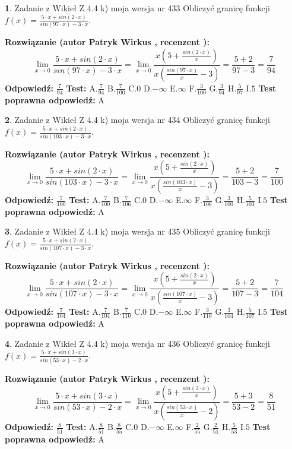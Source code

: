 \documentclass[12pt, a4paper]{article}
\theoremstyle{definition} %
\newtheorem{zad}{}
\newcommand{\zadStart}[1]{\begin{zad}#1\newline}
\newcommand{\zadStop}{\end{zad}}
\newcommand{\rozwStart}[2]{\noindent \textbf{Rozwiązanie (autor #1 , recenzent #2): }\newline}
\newcommand{\rozwStop}{\newline}
\newcommand{\odpStart}{\noindent \textbf{Odpowiedź:}\newline}
\newcommand{\odpStop}{\newline}
\newcommand{\testStart}{\noindent \textbf{Test:}\newline}
\newcommand{\testStop}{\newline}
\newcommand{\kluczStart}{\noindent \textbf{Test poprawna odpowiedź:}\newline}
\newcommand{\kluczStop}{\newline}
\begin{document}
\zadStart{Zadanie z Wikieł Z 4.4 k) moja wersja nr 433}
Obliczyć granicę funkcji $f(x)=\frac{5\cdot x +sin(2\cdot x)}{sin(97\cdot x) -3\cdot x}$.
\zadStop
\rozwStart{Patryk Wirkus}{}
$$\lim\limits_{x\to 0}\frac{5\cdot x +sin(2\cdot x)}{sin(97\cdot x) -3\cdot x}
=\lim\limits_{x\to 0}\frac{x(5+\frac{sin(2\cdot x)}{x})}{x(\frac{sin(97\cdot x)}{x}-3)}
=\frac{5+2}{97-3} = \frac{7}{94}$$
\rozwStop
\odpStart
$\frac{7}{94}$
\odpStop
\testStart
A.$\frac{7}{94}$
B.$\frac{7}{100}$
C.$0$
D.$-\infty$
E.$\infty$
F.$\frac{3}{100}$
G.$\frac{3}{94}$
H.$\frac{5}{97}$
I.$5$
\testStop
\kluczStart
A
\kluczStop



\zadStart{Zadanie z Wikieł Z 4.4 k) moja wersja nr 434}
Obliczyć granicę funkcji $f(x)=\frac{5\cdot x +sin(2\cdot x)}{sin(103\cdot x) -3\cdot x}$.
\zadStop
\rozwStart{Patryk Wirkus}{}
$$\lim\limits_{x\to 0}\frac{5\cdot x +sin(2\cdot x)}{sin(103\cdot x) -3\cdot x}
=\lim\limits_{x\to 0}\frac{x(5+\frac{sin(2\cdot x)}{x})}{x(\frac{sin(103\cdot x)}{x}-3)}
=\frac{5+2}{103-3} = \frac{7}{100}$$
\rozwStop
\odpStart
$\frac{7}{100}$
\odpStop
\testStart
A.$\frac{7}{100}$
B.$\frac{7}{106}$
C.$0$
D.$-\infty$
E.$\infty$
F.$\frac{3}{106}$
G.$\frac{3}{100}$
H.$\frac{5}{103}$
I.$5$
\testStop
\kluczStart
A
\kluczStop



\zadStart{Zadanie z Wikieł Z 4.4 k) moja wersja nr 435}
Obliczyć granicę funkcji $f(x)=\frac{5\cdot x +sin(2\cdot x)}{sin(107\cdot x) -3\cdot x}$.
\zadStop
\rozwStart{Patryk Wirkus}{}
$$\lim\limits_{x\to 0}\frac{5\cdot x +sin(2\cdot x)}{sin(107\cdot x) -3\cdot x}
=\lim\limits_{x\to 0}\frac{x(5+\frac{sin(2\cdot x)}{x})}{x(\frac{sin(107\cdot x)}{x}-3)}
=\frac{5+2}{107-3} = \frac{7}{104}$$
\rozwStop
\odpStart
$\frac{7}{104}$
\odpStop
\testStart
A.$\frac{7}{104}$
B.$\frac{7}{110}$
C.$0$
D.$-\infty$
E.$\infty$
F.$\frac{3}{110}$
G.$\frac{3}{104}$
H.$\frac{5}{107}$
I.$5$
\testStop
\kluczStart
A
\kluczStop



\zadStart{Zadanie z Wikieł Z 4.4 k) moja wersja nr 436}
Obliczyć granicę funkcji $f(x)=\frac{5\cdot x +sin(3\cdot x)}{sin(53\cdot x) -2\cdot x}$.
\zadStop
\rozwStart{Patryk Wirkus}{}
$$\lim\limits_{x\to 0}\frac{5\cdot x +sin(3\cdot x)}{sin(53\cdot x) -2\cdot x}
=\lim\limits_{x\to 0}\frac{x(5+\frac{sin(3\cdot x)}{x})}{x(\frac{sin(53\cdot x)}{x}-2)}
=\frac{5+3}{53-2} = \frac{8}{51}$$
\rozwStop
\odpStart
$\frac{8}{51}$
\odpStop
\testStart
A.$\frac{8}{51}$
B.$\frac{8}{55}$
C.$0$
D.$-\infty$
E.$\infty$
F.$\frac{2}{55}$
G.$\frac{2}{51}$
H.$\frac{5}{53}$
I.$5$
\testStop
\kluczStart
A
\kluczStop
\end{document}
